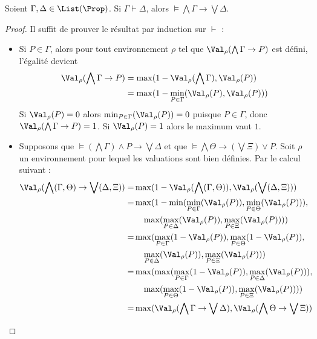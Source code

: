 \begin{theorem}
  Soient $\Gamma,\Delta\in\List(\Prop)$. Si $\Gamma\vdash\Delta$, alors
  $\models \bigwedge \Gamma\to \bigvee \Delta$.
\end{theorem}

\begin{proof}
  Il suffit de prouver le résultat par induction sur $\vdash$ :
  \begin{itemize}
  \item Si $P\in\Gamma$, alors pour tout environnement $\rho$ tel que
    $\Val_\rho(\bigwedge\Gamma\to P)$ est défini, l'égalité devient
    \begin{align*}
      \Val_\rho(\bigwedge\Gamma\to P) &= \max(1 - \Val_\rho(\bigwedge\Gamma),
      \Val_\rho(P))\\
      &=\max(1 - \min_{P\in\Gamma}(\Val_\rho(P),\Val_\rho(P)))
    \end{align*}
    Si $\Val_\rho(P) = 0$ alors $\min_{P\in\Gamma}(\Val_\rho(P)) = 0$ puisque
    $P\in\Gamma$, donc $\Val_\rho(\bigwedge\Gamma\to P) = 1$. Si $\Val_\rho(P)=1$
    alors le maximum vaut $1$.
  \item Supposons que $\models (\bigwedge\Gamma)\land P \to \bigvee\Delta$ et
    que $\models \bigwedge \Theta \to (\bigvee \Xi) \lor P$. Soit $\rho$ un
    environnement pour lequel les valuations sont bien définies. Par le calcul
    suivant :
    \begin{align*}
      \Val_\rho(\bigwedge (\Gamma,\Theta)\to\bigvee(\Delta,\Xi)) =&
      \max(1 - \Val_\rho(\bigwedge(\Gamma,\Theta)),
      \Val_\rho(\bigvee(\Delta,\Xi)))\\
      =& \max(1 - \min(\min_{P \in \Gamma}(\Val_\rho(P)),
      \min_{P\in\Theta}(\Val_\rho(P))),\\
      &\quad\max(\max_{P\in\Delta}(\Val_\rho(P)),
      \max_{P\in\Xi}(\Val_\rho(P))))\\
      =& \max(\max_{P\in \Gamma}(1-\Val_\rho(P)),\max_{P\in\Theta}(1-\Val_\rho(P)),\\
      &\quad \max_{P\in\Delta}(\Val_\rho(P)),\max_{P\in\Xi}(\Val_\rho(P)))\\
      =&\max(\max(\max_{P\in \Gamma}(1-\Val_\rho(P)),\max_{P\in\Delta}(\Val_\rho(P))),
      \\
      &\quad \max(\max_{P\in\Theta}(1-\Val_\rho(P)),\max_{P\in\Xi}(\Val_\rho(P))))\\
      =&\max(\Val_\rho(\bigwedge\Gamma\to\bigvee\Delta),\Val_\rho(\bigwedge\Theta
      \to\bigvee\Xi))
    \end{align*}

\end{itemize}
\end{proof}
